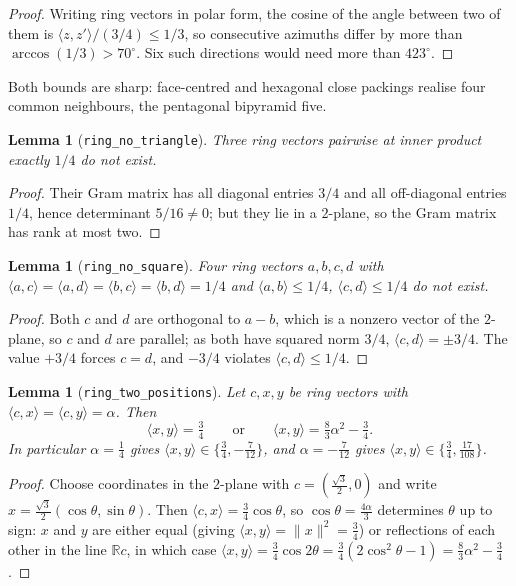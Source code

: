 \documentclass[11pt,a4paper]{article}
\theoremstyle{plain}
\newtheorem{lemma}[theorem]{Lemma}
\theoremstyle{definition}
\newcommand{\R}{\mathbb{R}}
\newcommand{\norm}[1]{\lVert #1 \rVert}
\newcommand{\inner}[2]{\langle #1, #2 \rangle}
\begin{document}
\begin{proof}
Writing ring vectors in polar form, the cosine of the angle between two of them is
$\inner{z}{z'} / (3/4) \le 1/3$, so consecutive azimuths differ by more than
$\arccos(1/3) > 70^\circ$. Six such directions would need more than $423^\circ$.
\end{proof}

Both bounds are sharp: face-centred and hexagonal close packings realise four common
neighbours, the pentagonal bipyramid five.

\begin{lemma}[\texttt{ring\_no\_triangle}]
\label{lem:notri}
Three ring vectors pairwise at inner product exactly $1/4$ do not exist.
\end{lemma}

\begin{proof}
Their Gram matrix has all diagonal entries $3/4$ and all off-diagonal entries $1/4$,
hence determinant $5/16 \ne 0$; but they lie in a $2$-plane, so the Gram matrix has
rank at most two.
\end{proof}

\begin{lemma}[\texttt{ring\_no\_square}]
\label{lem:nosq}
Four ring vectors $a,b,c,d$ with
$\inner{a}{c} = \inner{a}{d} = \inner{b}{c} = \inner{b}{d} = 1/4$
and $\inner{a}{b} \le 1/4$, $\inner{c}{d} \le 1/4$ do not exist.
\end{lemma}

\begin{proof}
Both $c$ and $d$ are orthogonal to $a - b$, which is a nonzero vector of the $2$-plane,
so $c$ and $d$ are parallel; as both have squared norm $3/4$,
$\inner{c}{d} = \pm 3/4$. The value $+3/4$ forces $c = d$, and $-3/4$ violates
$\inner{c}{d} \le 1/4$.
\end{proof}

\begin{lemma}[\texttt{ring\_two\_positions}]
\label{lem:twopos}
Let $c,x,y$ be ring vectors with $\inner{c}{x} = \inner{c}{y} = \alpha$. Then
\[
  \inner{x}{y} = \tfrac34
  \qquad\text{or}\qquad
  \inner{x}{y} = \tfrac{8}{3}\alpha^2 - \tfrac34 .
\]
In particular $\alpha = \tfrac14$ gives $\inner{x}{y} \in \{\tfrac34, -\tfrac{7}{12}\}$,
and $\alpha = -\tfrac{7}{12}$ gives $\inner{x}{y} \in \{\tfrac34, \tfrac{17}{108}\}$.
\end{lemma}

\begin{proof}
Choose coordinates in the $2$-plane with $c = (\tfrac{\sqrt3}{2},0)$ and write
$x = \tfrac{\sqrt3}{2}(\cos\theta,\sin\theta)$. Then $\inner{c}{x} = \tfrac34\cos\theta$,
so $\cos\theta = \tfrac{4\alpha}{3}$ determines $\theta$ up to sign: $x$ and $y$ are
either equal (giving $\inner{x}{y} = \norm{x}^2 = \tfrac34$) or reflections of each
other in the line $\R c$, in which case
$\inner{x}{y} = \tfrac34\cos 2\theta = \tfrac34(2\cos^2\theta - 1)
= \tfrac{8}{3}\alpha^2 - \tfrac34$.
\end{proof}
\end{document}
